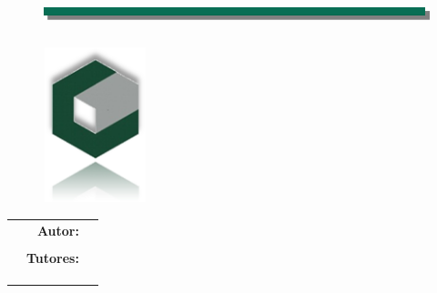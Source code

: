 \begin{titlepage}

	\begin{center}
		\begin{figure}
			\includegraphics[width=17cm,height=1cm]{Figuras/separador.png}
		\end{figure}
		\sf {\large \textbf{\myUniversity}}
	
		{\large \textbf{\myFaculty}}
	
		{\large \textbf{\myGroup}}
	    
		\vspace{2em}
		
		\begin{figure}[h]
			\centering
			\includegraphics[width=3cm,height=4.5cm]{Figuras/Logo.png}
		\end{figure}
		
		\vspace{1em}

		{\large \textbf{\myTitle}}
		
		\vspace{1em}
		
		{\large \textbf{\myPartyalFulfillment}}
		{\large \textbf{\myDegree}}
		
	\end{center}
	
	\begin{table}[ht] 
		\centering 
		\begin{tabular}{ l  r  l }
			\hspace{6cm} & \sf \textbf{Autor:} & \sf \textbf{\myAuthorName} \\
			\hspace{3cm} &  & \sf \textbf{\myAuthorEmail} \\
			
			\hspace{3cm} & \sf \textbf{Tutores:} & \sf \textbf{\myTutorOne} \\
			\hspace{3cm} &  & \sf \textbf{\myTutorOneEmail} \\
			\hspace{3cm} &  & \sf \textbf{\myTutorTwo} \\
			\hspace{3cm} &  & \sf \textbf{\myTutorTwoEmail} \\
		\end{tabular}
	\end{table}
	

\end{titlepage}
